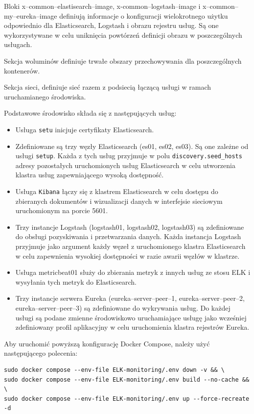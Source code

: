 Bloki x--common--elastisearch--image, x-common--logstash--image i x--common--my--eureka--image definiują informacje o konfiguracji wielokrotnego użytku odpowiednio dla Elasticsearch, Logstash i obrazu rejestru usług. Są one wykorzystywane w celu uniknięcia powtórzeń definicji obrazu w poszczególnych usługach.

Sekcja woluminów definiuje trwałe obszary przechowywania dla poszczególnych kontenerów.

Sekcja sieci, definiuje sieć razem z podsiecią łączącą usługi w ramach uruchamianego środowiska.

Podstawowe środowisko składa się z następujących usług:
\begin{itemize}
    \item Usługa \verb|setu| inicjuje certyfikaty Elasticsearch. 
    \item Zdefiniowane są trzy węzły Elasticsearch (es01, es02, es03). Są one zależne od usługi \verb|setup|. Każda z tych usług przyjmuje w polu \verb|discovery.seed_hosts| adresy pozostałych uruchomionych usług Elasticsearch w celu utworzenia klastra usług zapewniającego wysoką dostępność.
    \item Usługa \verb|Kibana| łączy się z klastrem Elasticsearch w celu dostępu do zbieranych dokumentów i wizualizacji danych w interfejsie sieciowym uruchomionym na porcie 5601.
    \item Trzy instancje Logstash (logstash01, logstash02, logstash03) są zdefiniowane do obsługi pozyskiwania i przetwarzania danych. Każda instancja Logstash przyjmuje jako argument każdy węzeł z uruchomionego klastra Elasticsearch w celu zapewnienia wysokiej dostępności w razie awarii węzłów w klastrze.
    \item Usługa metricbeat01 służy do zbierania metryk z innych usług ze stosu ELK i wysyłania tych metryk do Elasticsearch.
    \item Trzy instancje serwera Eureka (eureka--server--peer--1, eureka--server--peer--2, eureka--server--peer--3) są zdefiniowane do wykrywania usług. Do każdej usługi są podane zmienne środowiskowo uruchamiające usługę jako wcześniej zdefiniowany profil aplikacyjny w celu uruchomienia klastra rejestrów Eureka.
\end{itemize}

Aby uruchomić powyższą konfigurację Docker Compose, należy użyć następującego polecenia:

\begin{verbatim}
sudo docker compose --env-file ELK-monitoring/.env down -v && \
sudo docker compose --env-file ELK-monitoring/.env build --no-cache && \
sudo docker compose --env-file ELK-monitoring/.env up --force-recreate -d
\end{verbatim}


